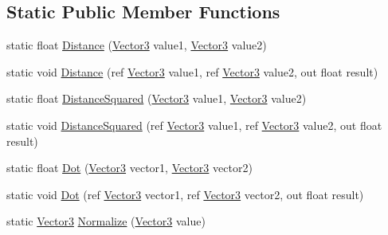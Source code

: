 \subsection*{Static Public Member Functions}
\begin{DoxyCompactItemize}
\item 
static float \hyperlink{struct_microsoft_1_1_xna_1_1_framework_1_1_vector3_aa7f180625d86ea42d9b706f9963dff55}{Distance} (\hyperlink{struct_microsoft_1_1_xna_1_1_framework_1_1_vector3}{Vector3} value1, \hyperlink{struct_microsoft_1_1_xna_1_1_framework_1_1_vector3}{Vector3} value2)
\item 
static void \hyperlink{struct_microsoft_1_1_xna_1_1_framework_1_1_vector3_a258afff705ecf6ad9e47e17a65af7111}{Distance} (ref \hyperlink{struct_microsoft_1_1_xna_1_1_framework_1_1_vector3}{Vector3} value1, ref \hyperlink{struct_microsoft_1_1_xna_1_1_framework_1_1_vector3}{Vector3} value2, out float result)
\item 
static float \hyperlink{struct_microsoft_1_1_xna_1_1_framework_1_1_vector3_ae4c49ae4d92c0396d3970b62098c22fb}{Distance\+Squared} (\hyperlink{struct_microsoft_1_1_xna_1_1_framework_1_1_vector3}{Vector3} value1, \hyperlink{struct_microsoft_1_1_xna_1_1_framework_1_1_vector3}{Vector3} value2)
\item 
static void \hyperlink{struct_microsoft_1_1_xna_1_1_framework_1_1_vector3_ac04f7685f6b6a970daaa716647c35fa1}{Distance\+Squared} (ref \hyperlink{struct_microsoft_1_1_xna_1_1_framework_1_1_vector3}{Vector3} value1, ref \hyperlink{struct_microsoft_1_1_xna_1_1_framework_1_1_vector3}{Vector3} value2, out float result)
\item 
static float \hyperlink{struct_microsoft_1_1_xna_1_1_framework_1_1_vector3_a2a1649392776e7d977e7f946660e58b1}{Dot} (\hyperlink{struct_microsoft_1_1_xna_1_1_framework_1_1_vector3}{Vector3} vector1, \hyperlink{struct_microsoft_1_1_xna_1_1_framework_1_1_vector3}{Vector3} vector2)
\item 
static void \hyperlink{struct_microsoft_1_1_xna_1_1_framework_1_1_vector3_a6bc2bc6827728a22d8554e9dee37ff00}{Dot} (ref \hyperlink{struct_microsoft_1_1_xna_1_1_framework_1_1_vector3}{Vector3} vector1, ref \hyperlink{struct_microsoft_1_1_xna_1_1_framework_1_1_vector3}{Vector3} vector2, out float result)
\item 
static \hyperlink{struct_microsoft_1_1_xna_1_1_framework_1_1_vector3}{Vector3} \hyperlink{struct_microsoft_1_1_xna_1_1_framework_1_1_vector3_aa5fb4b05ba718b94f118659e310750a8}{Normalize} (\hyperlink{struct_microsoft_1_1_xna_1_1_framework_1_1_vector3}{Vector3} value)

\end{DoxyCompactItemize}
